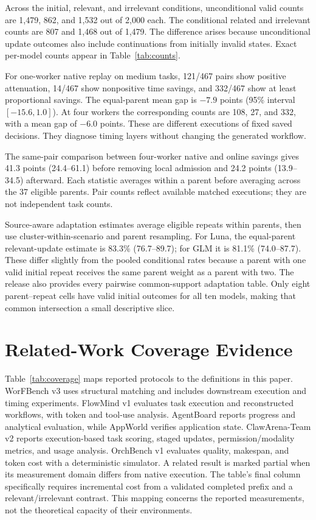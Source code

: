 Across the initial, relevant, and irrelevant conditions, unconditional valid counts are 1,479, 862, and 1,532 out of 2,000 each. The conditional related and irrelevant counts are 807 and 1,468 out of 1,479. The difference arises because unconditional update outcomes also include continuations from initially invalid states. Exact per-model counts appear in Table~\ref{tab:counts}.

For one-worker native replay on medium tasks, 121/467 pairs show positive attenuation, 14/467 show nonpositive time savings, and 332/467 show at least proportional savings. The equal-parent mean gap is $-7.9$ points (95\% interval $[-15.6,1.0]$). At four workers the corresponding counts are 108, 27, and 332, with a mean gap of $-6.0$ points. These are different executions of fixed saved decisions. They diagnose timing layers without changing the generated workflow.

The same-pair comparison between four-worker native and online savings gives 41.3 points (24.4--61.1) before removing local admission and 24.2 points (13.9--34.5) afterward. Each statistic averages within a parent before averaging across the 37 eligible parents. Pair counts reflect available matched executions; they are not independent task counts.

Source-aware adaptation estimates average eligible repeats within parents, then use cluster-within-scenario and parent resampling. For Luna, the equal-parent relevant-update estimate is 83.3\% (76.7--89.7); for GLM it is 81.1\% (74.0--87.7). These differ slightly from the pooled conditional rates because a parent with one valid initial repeat receives the same parent weight as a parent with two. The release also provides every pairwise common-support adaptation table. Only eight parent--repeat cells have valid initial outcomes for all ten models, making that common intersection a small descriptive slice.

\section{Related-Work Coverage Evidence}
\label{app:coverage}

Table~\ref{tab:coverage} maps reported protocols to the definitions in this paper. WorFBench v3 uses structural matching and includes downstream execution and timing experiments. FlowMind v1 evaluates task execution and reconstructed workflows, with token and tool-use analysis. AgentBoard reports progress and analytical evaluation, while AppWorld verifies application state. ClawArena-Team v2 reports execution-based task scoring, staged updates, permission/modality metrics, and usage analysis. OrchBench v1 evaluates quality, makespan, and token cost with a deterministic simulator. A related result is marked partial when its measurement domain differs from native execution. The table's final column specifically requires incremental cost from a validated completed prefix and a relevant/irrelevant contrast. This mapping concerns the reported measurements, not the theoretical capacity of their environments.

